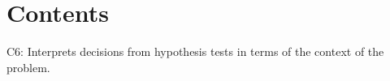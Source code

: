 



\section*{Contents}
\setcounter{tocdepth}{2}
\setcounter{secnumdepth}{1}
\tableofcontents

\begin{ExamCriteria}
    \item C6: Interprets decisions from hypothesis tests in terms of the context of the problem.
\end{ExamCriteria}

